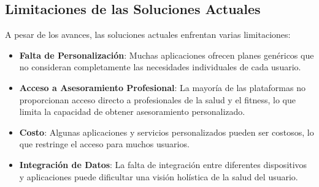 \subsection{Limitaciones de las Soluciones Actuales}

A pesar de los avances, las soluciones actuales enfrentan varias limitaciones:

\begin{itemize}
  \item \textbf{Falta de Personalización}: Muchas aplicaciones ofrecen planes genéricos que no consideran completamente las necesidades individuales de cada usuario.
  \item \textbf{Acceso a Asesoramiento Profesional}: La mayoría de las plataformas no proporcionan acceso directo a profesionales de la salud y el fitness, lo que limita la capacidad de obtener asesoramiento personalizado.
  \item \textbf{Costo}: Algunas aplicaciones y servicios personalizados pueden ser costosos, lo que restringe el acceso para muchos usuarios.
  \item \textbf{Integración de Datos}: La falta de integración entre diferentes dispositivos y aplicaciones puede dificultar una visión holística de la salud del usuario.
\end{itemize}